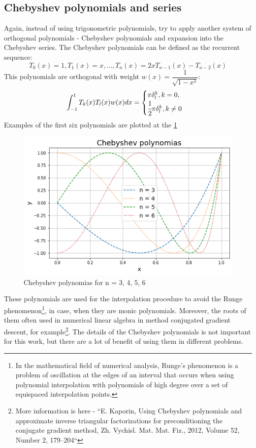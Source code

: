 \subsection{Chebyshev polynomials and series}
Again, instead of using trigonometric polynomials, try to apply another system of orthogonal polynomials - Chebyshev polynomials and expansion into the Chebyshev series. 
The Chebyshev polynomials can be defined as the recurrent sequence:
\begin{equation}
	T_0(x) = 1, T_1(x) = x, \dots, T_n(x) = 2 x T_{n - 1}(x) - T_{n - 2}(x)
\end{equation}
This polynomials are orthogonal with weight $w(x) = \dfrac{1}{\sqrt{1 - x^2}}$\cite{mason2002chebyshev}:
\begin{equation}
	\label{eq:chebyshev_series}
	\int_{-1}^{1} T_k(x) T_l(x) w(x) dx = \begin{cases}
		\pi \delta_l^k, k = 0, \\
		\cfrac{1}{2} \pi \delta_l^k, k \neq 0
	\end{cases}
\end{equation}
Examples of the first six polynomials are plotted at the \ref{fig:chebyshev_demo}
\begin{figure}[h]
	\centering
	\includegraphics[width=0.65 \textwidth]{images/chapter2/chebyshev_demo.png}
	\caption{Chebyshev polynomias for n = 3, 4, 5, 6}
	\label{fig:chebyshev_demo}
\end{figure}

These polynomials are used for the interpolation procedure to avoid the Runge phenomenon\footnote{In the mathematical field of numerical analysis, Runge's phenomenon is a problem of oscillation at the edges of an interval that occurs when using polynomial interpolation with polynomials of high degree over a set of equispaced interpolation points.}, in case, when they are monic polynomials. Moreover, the roots of them often used in numerical linear algebra in method conjugated gradient descent, for example\footnote{
More information is here - ``E. Kaporin, Using Chebyshev polynomials and approximate inverse triangular
factorizations for preconditioning the conjugate gradient method, Zh. Vychisl. Mat.
Mat. Fiz., 2012, Volume 52, Number 2, 179–204``}.
The details of the Chebyshev polynomials is not important for this work, but there are a lot of benefit of using them in different problems.


